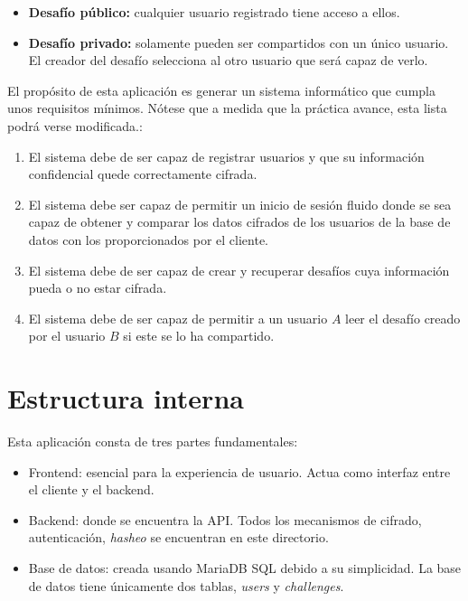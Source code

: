 \documentclass[a4paper,12pt]{report}
\begin{document}
\begin{itemize}
    \item \textbf{Desafío público:} cualquier usuario registrado tiene acceso a ellos.
    \item \textbf{Desafío privado:} solamente pueden ser compartidos con un único usuario. El creador del desafío selecciona al otro usuario que será capaz de verlo.
\end{itemize}

El propósito de esta aplicación es generar un sistema informático que cumpla unos requisitos mínimos. Nótese que a medida que la práctica avance, esta lista podrá verse modificada.:\begin{enumerate}
    \item El sistema debe de ser capaz de registrar usuarios y que su información confidencial quede correctamente cifrada.
    \item El sistema debe ser capaz de permitir un inicio de sesión fluido donde se sea capaz de obtener y comparar los datos cifrados de los usuarios de la base de datos con los proporcionados por el cliente.
    \item El sistema debe de ser capaz de crear y recuperar desafíos cuya información pueda o no estar cifrada.
    \item El sistema debe de ser capaz de permitir a un usuario $A$ leer el desafío creado por el usuario $B$ si este se lo ha compartido.
\end{enumerate}

\section{Estructura interna}

Esta aplicación consta de tres partes fundamentales:
\begin{itemize}
    \item Frontend: esencial para la experiencia de usuario. Actua como interfaz entre el cliente y el backend.
    \item Backend: donde se encuentra la API. Todos los mecanismos de cifrado, autenticación, \textit{hasheo} se encuentran en este directorio.
    \item Base de datos: creada usando MariaDB SQL debido a su simplicidad. La base de datos tiene únicamente dos tablas, \textit{users} y \textit{challenges}.
\end{itemize}

\newpage 
\end{document}
